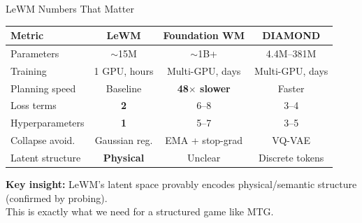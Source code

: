 \documentclass[aspectratio=169, 11pt]{beamer}
\begin{document}
\begin{frame}{LeWM Numbers That Matter}
  \begin{table}
    \centering\small
    \begin{tabular}{@{}lccc@{}}
      \toprule
      \textbf{Metric} & \textbf{LeWM} & \textbf{Foundation WM} & \textbf{DIAMOND} \\
      \midrule
      Parameters       & $\sim$15M     & $\sim$1B+              & 4.4M--381M \\
      Training         & 1 GPU, hours  & Multi-GPU, days        & Multi-GPU, days \\
      Planning speed   & Baseline      & \textbf{48$\times$ slower}  & Faster \\
      Loss terms       & \textbf{2}    & 6--8                   & 3--4 \\
      Hyperparameters  & \textbf{1}    & 5--7                   & 3--5 \\
      Collapse avoid.  & Gaussian reg. & EMA + stop-grad        & VQ-VAE \\
      Latent structure & \textbf{Physical} & Unclear             & Discrete tokens \\
      \bottomrule
    \end{tabular}
  \end{table}
  \vspace{0.3cm}
  \textbf{Key insight:} LeWM's latent space provably encodes physical/semantic structure (confirmed by probing).\\
  This is exactly what we need for a structured game like MTG.
\end{frame}
\end{document}

